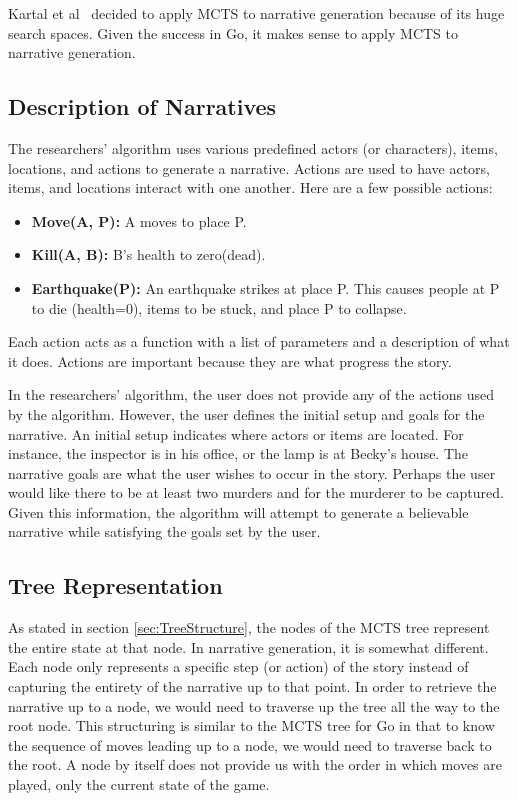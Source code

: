 \documentclass{sig-alternate}
\begin{document}
Kartal et al~\cite{Narrative} decided to apply MCTS to narrative generation because of its huge search spaces. Given the success in Go, it makes sense to apply MCTS to narrative generation.

\subsection{Description of Narratives}
The researchers' algorithm uses various predefined actors (or characters), items, locations, and actions to generate a narrative. Actions are used to have actors, items, and locations interact with one another. Here are a few possible actions:
\begin{itemize}
\item \textbf{Move(A, P):} A moves to place P.
\item \textbf{Kill(A, B):} B's health to zero(dead).
\item \textbf{Earthquake(P):} An earthquake strikes at place P. This causes people at P to die (health=0), items to be stuck, and place P to collapse.
\end{itemize}
Each action acts as a function with a list of parameters and a description of what it does. Actions are important because they are what progress the story. 

In the researchers' algorithm, the user does not provide any of the actions used by the algorithm. However, the user defines the initial setup and goals for the narrative. An initial setup indicates where actors or items are located. For instance, the inspector is in his office, or the lamp is at Becky's house. The narrative goals are what the user wishes to occur in the story. Perhaps the user would like there to be at least two murders and for the murderer to be captured. Given this information, the algorithm will attempt to generate a believable narrative while satisfying the goals set by the user.

\subsection{Tree Representation}
As stated in section \ref{sec:TreeStructure}, the nodes of the MCTS tree represent the entire state at that node. In narrative generation, it is somewhat different. Each node only represents a specific step (or action) of the story instead of capturing the entirety of the narrative up to that point. In order to retrieve the narrative up to a node, we would need to traverse up the tree all the way to the root node. This structuring is similar to the MCTS tree for Go in that to know the sequence of moves leading up to a node, we would need to traverse back to the root. A node by itself does not provide us with the order in which moves are played, only the current state of the game.
\end{document}
